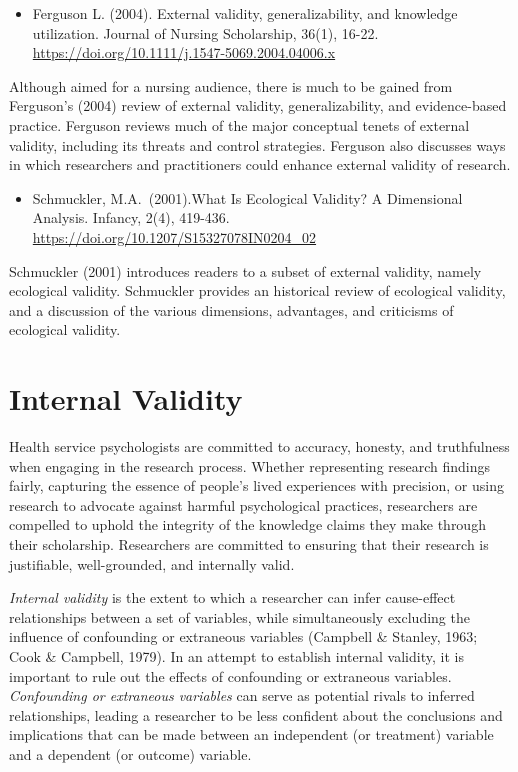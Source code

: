 \documentclass[
  11pt,
]{book}
\providecommand{\tightlist}{%
  \setlength{\itemsep}{0pt}\setlength{\parskip}{0pt}}
\begin{document}
\begin{itemize}
\tightlist
\item
  Ferguson L. (2004). External validity, generalizability, and knowledge utilization. Journal of Nursing Scholarship, 36(1), 16-22. \url{https://doi.org/10.1111/j.1547-5069.2004.04006.x}
\end{itemize}

Although aimed for a nursing audience, there is much to be gained from Ferguson's (2004) review of external validity, generalizability, and evidence-based practice. Ferguson reviews much of the major conceptual tenets of external validity, including its threats and control strategies. Ferguson also discusses ways in which researchers and practitioners could enhance external validity of research.

\begin{itemize}
\tightlist
\item
  Schmuckler, M.A.~(2001).What Is Ecological Validity? A Dimensional Analysis. Infancy, 2(4), 419-436. \url{https://doi.org/10.1207/S15327078IN0204_02}
\end{itemize}

Schmuckler (2001) introduces readers to a subset of external validity, namely ecological validity. Schmuckler provides an historical review of ecological validity, and a discussion of the various dimensions, advantages, and criticisms of ecological validity.

\hypertarget{internal-validity}{%
\section{Internal Validity}\label{internal-validity}}

Health service psychologists are committed to accuracy, honesty, and truthfulness when engaging in the research process. Whether representing research findings fairly, capturing the essence of people's lived experiences with precision, or using research to advocate against harmful psychological practices, researchers are compelled to uphold the integrity of the knowledge claims they make through their scholarship. Researchers are committed to ensuring that their research is justifiable, well-grounded, and internally valid.

\emph{Internal validity} is the extent to which a researcher can infer cause-effect relationships between a set of variables, while simultaneously excluding the influence of confounding or extraneous variables (Campbell \& Stanley, 1963; Cook \& Campbell, 1979). In an attempt to establish internal validity, it is important to rule out the effects of confounding or extraneous variables. \emph{Confounding or extraneous variables} can serve as potential rivals to inferred relationships, leading a researcher to be less confident about the conclusions and implications that can be made between an independent (or treatment) variable and a dependent (or outcome) variable.
\end{document}

